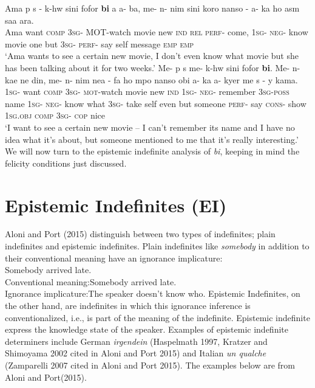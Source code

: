 \documentclass[output=paper,
modfonts
]{langsci/langscibook}
\begin{document}
\ex\label{ex21}
 \gll Ama p s - k-hw sini fofor \textbf{bi} a a- ba, me- n- nim sini koro nanso - a- ka ho asm saa ara.\\
Ama want \textsc{comp} \textsc{3sg}- \textsc{MOT}-watch movie new \textsc{ind} \textsc{rel} \textsc{perf}- come, \textsc{1sg}- \textsc{neg}- know movie one but \textsc{3sg}- \textsc{perf}- say self message \textsc{emp} \textsc{emp} \\
\glt `Ama wants to see a certain new movie, I don't even know what movie but she has been talking about it for two weeks.'
\ex\label{ex20a}
\gll Me- p s me- k-hw sini fofor \textbf{bi}. Me- n- kae ne din, me- n- nim nea - fa ho mpo nanso obi a- ka a- kyer me s - y kama.\\
\textsc{1sg}- want \textsc{comp} \textsc{3sg}- \textsc{mot}-watch movie new \textsc{ind} \textsc{1sg}- \textsc{neg}- remember \textsc{3sg}-\textsc{poss} name \textsc{1sg}- \textsc{neg}- know what \textsc{3sg}- take self even but someone \textsc{perf}- say \textsc{cons}- show \textsc{1sg}.\textsc{obj} \textsc{comp} \textsc{3sg}- \textsc{cop} nice\\
\glt `I want to see a certain new movie – I can’t remember its name and I have no idea what it’s about, but someone mentioned to me that it’s really interesting.'
\z\z
We will now turn to the epistemic indefinite analysis of \emph{bi}, keeping in mind the felicity conditions just discussed.
\section{Epistemic Indefinites (EI)}

Aloni and Port (2015) distinguish between two types of indefinites; plain indefinites and epistemic indefinites. Plain indefinites like \emph{somebody} in addition to their conventional meaning have an ignorance implicature:
\ea
\ea\label{ex25}\\
 Somebody arrived late.\\
\ea Conventional meaning:Somebody arrived late.\\
\ex Ignorance implicature:The speaker doesn't know who.
\z \z\z
Epistemic Indefinites, on the other hand, are indefinites in which this ignorance inference is conventionalized, i.e., is part of the meaning of the indefinite. Epistemic indefinite express the knowledge state of the speaker. Examples of epistemic indefinite determiners include German \emph{irgendein} (Haspelmath 1997, Kratzer and Shimoyama 2002 cited in Aloni and Port 2015) and Italian \emph{un qualche}  (Zamparelli 2007 cited in Aloni and Port 2015). The examples below are from Aloni and Port(2015).
\end{document}
